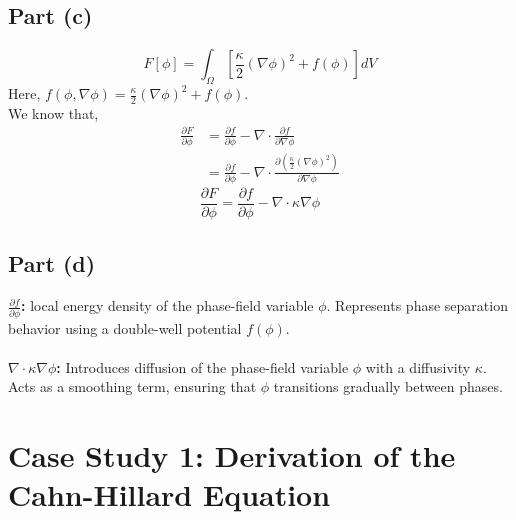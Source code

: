\documentclass[12pt]{article}
\begin{document}
\subsection*{Part (c)}
\begin{equation*}
    F[\phi] = \int_{\Omega} [\frac{\kappa}{2} (\nabla \phi)^2 + f(\phi)] dV
\end{equation*}
Here, $f(\phi, \nabla \phi) = \frac{\kappa}{2} (\nabla \phi)^2 + f(\phi)$.\\
We know that,
\begin{equation*}
    \begin{split}
        \frac{\partial F}{\partial \phi} &= \frac{\partial f}{\partial \phi} - \nabla \cdot \frac{\partial f}{\partial \nabla \phi} \\
        &= \frac{\partial f}{\partial \phi} - \nabla \cdot \frac{\partial (\frac{\kappa}{2} (\nabla \phi)^2)}{\partial \nabla \phi} 
    \end{split}
\end{equation*}
\begin{equation*}
    \boxed{\frac{\partial F}{\partial \phi} = \frac{\partial f}{\partial \phi} - \nabla \cdot \kappa \nabla \phi} 
\end{equation*}

\subsection*{Part (d)}
\textbf{$\frac{\partial f}{\partial \phi}$:} local energy density of the phase-field variable $\phi$. Represents phase separation behavior using a double-well potential $f(\phi)$.\\
\\
\textbf{$\nabla \cdot \kappa \nabla \phi$:} Introduces diffusion of the phase-field variable $\phi$ with a diffusivity $\kappa$. Acts as a smoothing term, ensuring that $\phi$ transitions gradually between phases.


\section*{Case Study 1: Derivation of the Cahn-Hillard Equation}
\end{document}
